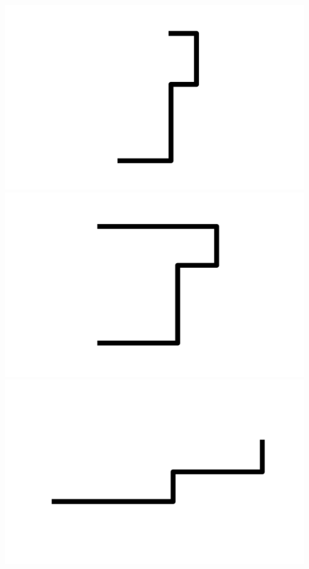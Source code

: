 \documentclass[]{report}
\begin{document}
\includegraphics[scale=.1]{pictures/21/state_cluster_shapes_25.pdf} 
\includegraphics[scale=.1]{pictures/21/state_cluster_shapes_26.pdf} 
\includegraphics[scale=.1]{pictures/21/state_cluster_shapes_27.pdf} 
\end{document}
